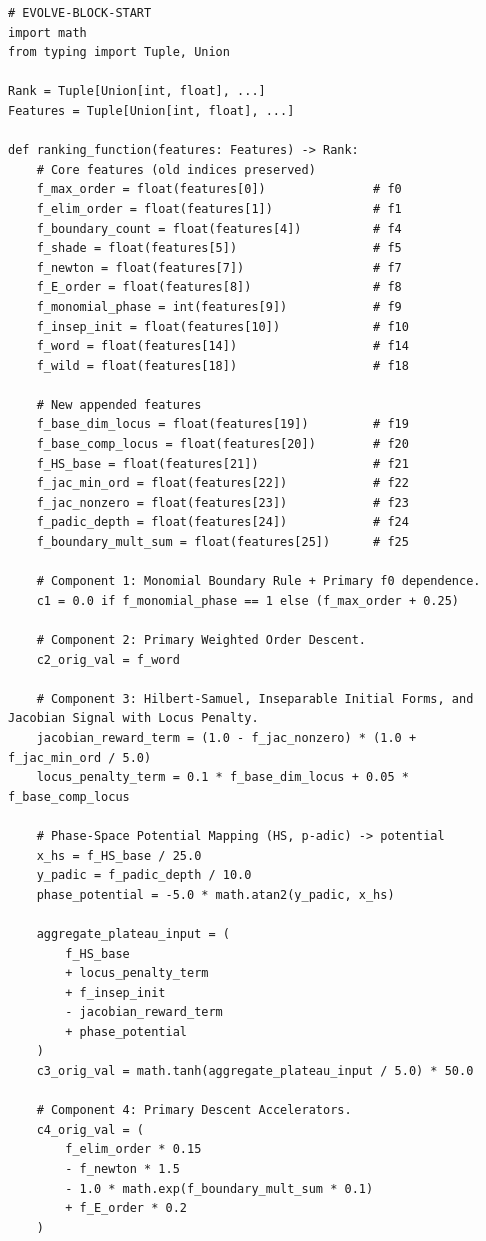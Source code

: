 \documentclass[11pt]{amsart}
\begin{document}
\begin{verbatim}
# EVOLVE-BLOCK-START
import math
from typing import Tuple, Union

Rank = Tuple[Union[int, float], ...]
Features = Tuple[Union[int, float], ...]

def ranking_function(features: Features) -> Rank:
    # Core features (old indices preserved)
    f_max_order = float(features[0])               # f0
    f_elim_order = float(features[1])              # f1
    f_boundary_count = float(features[4])          # f4
    f_shade = float(features[5])                   # f5
    f_newton = float(features[7])                  # f7
    f_E_order = float(features[8])                 # f8
    f_monomial_phase = int(features[9])            # f9
    f_insep_init = float(features[10])             # f10
    f_word = float(features[14])                   # f14
    f_wild = float(features[18])                   # f18

    # New appended features
    f_base_dim_locus = float(features[19])         # f19
    f_base_comp_locus = float(features[20])        # f20
    f_HS_base = float(features[21])                # f21
    f_jac_min_ord = float(features[22])            # f22
    f_jac_nonzero = float(features[23])            # f23
    f_padic_depth = float(features[24])            # f24
    f_boundary_mult_sum = float(features[25])      # f25

    # Component 1: Monomial Boundary Rule + Primary f0 dependence.
    c1 = 0.0 if f_monomial_phase == 1 else (f_max_order + 0.25)

    # Component 2: Primary Weighted Order Descent.
    c2_orig_val = f_word

    # Component 3: Hilbert-Samuel, Inseparable Initial Forms, and Jacobian Signal with Locus Penalty.
    jacobian_reward_term = (1.0 - f_jac_nonzero) * (1.0 + f_jac_min_ord / 5.0)
    locus_penalty_term = 0.1 * f_base_dim_locus + 0.05 * f_base_comp_locus

    # Phase-Space Potential Mapping (HS, p-adic) -> potential
    x_hs = f_HS_base / 25.0
    y_padic = f_padic_depth / 10.0
    phase_potential = -5.0 * math.atan2(y_padic, x_hs)

    aggregate_plateau_input = (
        f_HS_base
        + locus_penalty_term
        + f_insep_init
        - jacobian_reward_term
        + phase_potential
    )
    c3_orig_val = math.tanh(aggregate_plateau_input / 5.0) * 50.0

    # Component 4: Primary Descent Accelerators.
    c4_orig_val = (
        f_elim_order * 0.15
        - f_newton * 1.5
        - 1.0 * math.exp(f_boundary_mult_sum * 0.1)
        + f_E_order * 0.2
    )


\end{verbatim}
\end{document}
